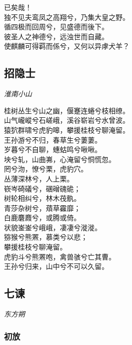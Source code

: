 \documentclass[]{article}
\begin{document}
已矣哉！\\
独不见夫鸾凤之高翔兮，乃集大皇之野。\\
循四极而回周兮，见盛德而後下。\\
彼圣人之神德兮，远浊世而自藏。\\
使麒麟可得羁而係兮，又何以异虖犬羊？

\hypertarget{header-n215}{%
\subsection{招隐士}\label{header-n215}}

\emph{淮南小山}

桂树丛生兮山之幽，偃蹇连蜷兮枝相缭。\\
山气巄嵷兮石嵯峨，溪谷崭岩兮水曾波。\\
猿狖群啸兮虎豹嗥，攀援桂枝兮聊淹留。\\
王孙游兮不归，春草生兮萋萋。\\
岁暮兮不自聊，蟪蛄鸣兮啾啾。\\
坱兮轧，山曲岪，心淹留兮恫慌忽。\\
罔兮沕，憭兮栗，虎豹穴。\\
丛薄深林兮，人上栗。\\
嵚岑碕礒兮，碅磳磈硊；\\
树轮相纠兮，林木茷骫。\\
青莎杂树兮，薠草靃靡；\\
白鹿麏麚兮，或腾或倚。\\
状貌崟崟兮峨峨，凄凄兮漇漇。\\
猕猴兮熊罴，慕类兮以悲；\\
攀援桂枝兮聊淹留。\\
虎豹斗兮熊罴咆，禽兽骇兮亡其曹。\\
王孙兮归来，山中兮不可以久留。

\hypertarget{header-n220}{%
\subsection{七谏}\label{header-n220}}

\emph{东方朔}

\hypertarget{header-n225}{%
\subsubsection{初放}\label{header-n225}}
\end{document}
